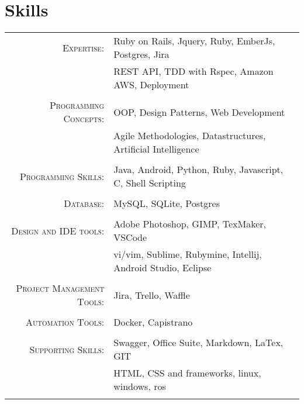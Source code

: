 \documentclass[a4paper,10pt]{article}
\begin{document}
\section{Skills}
\begin{tabular}{rl}	
\textsc{Expertise:} &Ruby on Rails, Jquery, Ruby, EmberJs, Postgres, Jira\\
								& REST API, TDD with Rspec, Amazon AWS, Deployment \\\\
\textsc{Programming Concepts:} &OOP, Design Patterns, Web Development \\
								&  Agile Methodologies, Datastructures, Artificial Intelligence\\\\
\textsc{Programming Skills:}  & Java, Android, Python, Ruby, Javascript, C, Shell Scripting\\\\
\textsc{Database:} & MySQL, SQLite, Postgres\\\\

\textsc{Design and IDE tools:} & Adobe Photoshop, GIMP, TexMaker, VSCode\\
							   & vi/vim, Sublime, Rubymine, Intellij, Android Studio, Eclipse\\\\
\textsc{Project Management Tools:} & Jira, Trello, Waffle\\\\	
\textsc{Automation Tools:} &Docker, Capistrano\\\\
\textsc{Supporting Skills:} & Swagger, Office Suite, Markdown, LaTex, GIT\\
		& HTML, CSS and frameworks, linux, windows, ros \\\\						   
		 
\end{tabular}
\end{document}
